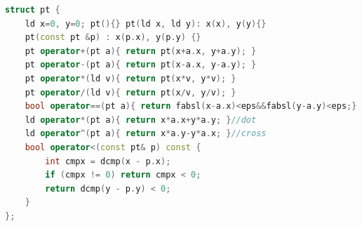 \begin{lstlisting}[language=C++]
struct pt {
    ld x=0, y=0; pt(){} pt(ld x, ld y): x(x), y(y){}
    pt(const pt &p) : x(p.x), y(p.y) {}
    pt operator+(pt a){ return pt(x+a.x, y+a.y); }
    pt operator-(pt a){ return pt(x-a.x, y-a.y); }
    pt operator*(ld v){ return pt(x*v, y*v); }
    pt operator/(ld v){ return pt(x/v, y/v); }
    bool operator==(pt a){ return fabsl(x-a.x)<eps&&fabsl(y-a.y)<eps;}
    ld operator*(pt a){ return x*a.x+y*a.y; }//dot
    ld operator^(pt a){ return x*a.y-y*a.x; }//cross
    bool operator<(const pt& p) const {
        int cmpx = dcmp(x - p.x);
        if (cmpx != 0) return cmpx < 0;
        return dcmp(y - p.y) < 0;
    }
};
\end{lstlisting}

{}
